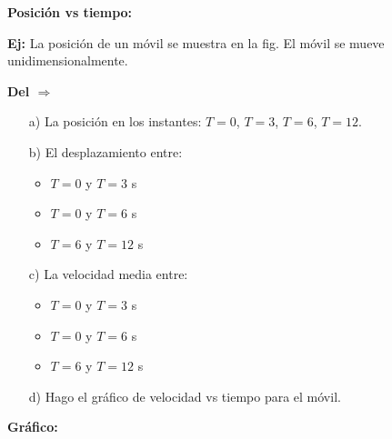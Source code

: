 \textbf{Posición vs tiempo:}

\begin{center}
\end{center}

\noindent
\textbf{Ej:} La posición de un móvil se muestra en la fig. El móvil se mueve unidimensionalmente.

\vspace{0.3cm}

\noindent
\textbf{Del $\Rightarrow$}

\begin{enumerate}
    \item[a)] La posición en los instantes: $T=0$, $T=3$, $T=6$, $T=12$.
    \item[b)] El desplazamiento entre:
    \begin{itemize}
        \item $T=0$ y $T=3$ s
        \item $T=0$ y $T=6$ s
        \item $T=6$ y $T=12$ s
    \end{itemize}
    \item[c)] La velocidad media entre:
    \begin{itemize}
        \item $T=0$ y $T=3$ s
        \item $T=0$ y $T=6$ s
        \item $T=6$ y $T=12$ s
    \end{itemize}
    \item[d)] Hago el gráfico de velocidad vs tiempo para el móvil.
\end{enumerate}

\vspace{0.3cm}
\noindent
\textbf{Gráfico:}

